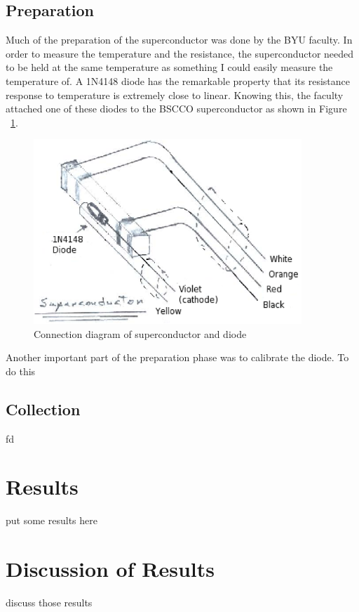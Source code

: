 \documentclass[paper=a4, fontsize=11pt]{scrartcl}
\numberwithin{equation}{section}
\numberwithin{figure}{section}
\numberwithin{table}{section}
\begin{document}
      \subsection{Preparation}

            Much of the preparation of the superconductor was done by the BYU faculty. In order to measure the temperature and the resistance, the superconductor needed to be held at the same temperature as something I could easily measure the temperature of. A 1N4148 diode has the remarkable property that its resistance response to temperature is extremely close to linear. Knowing this, the faculty attached one of these diodes to the BSCCO superconductor as shown in Figure ~\ref{fig:scDiode}.

            \begin{figure}[h]
                  \includegraphics[width=0.9\textwidth]{Figures/SuperconductorDrawing.eps}
                  \caption{Connection diagram of superconductor and diode}
                  \label{fig:scDiode}
            \end{figure}

            Another important part of the preparation phase was to calibrate the diode. To do this

      \subsection{Collection}

            fd

  \section{Results}

      put some results here

  \section{Discussion of Results}

      discuss those results

  \clearpage
  \pagestyle{empty}
  

\end{document}
